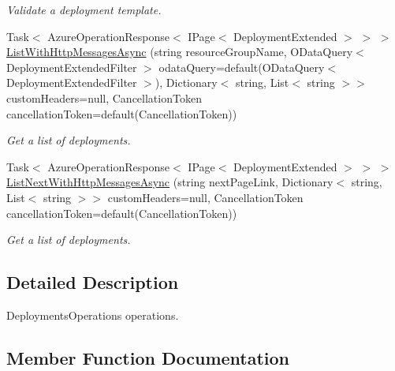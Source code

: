 \begin{DoxyCompactItemize}
\begin{DoxyCompactList}\small\item\em Validate a deployment template. \end{DoxyCompactList}\item 
Task$<$ Azure\+Operation\+Response$<$ I\+Page$<$ Deployment\+Extended $>$ $>$ $>$ \hyperlink{interface_microsoft_1_1_azure_1_1_management_1_1_resources_1_1_i_deployments_operations_a5c19611a775bc858103ff85f3b487bb9}{List\+With\+Http\+Messages\+Async} (string resource\+Group\+Name, O\+Data\+Query$<$ Deployment\+Extended\+Filter $>$ odata\+Query=default(O\+Data\+Query$<$ Deployment\+Extended\+Filter $>$), Dictionary$<$ string, List$<$ string $>$$>$ custom\+Headers=null, Cancellation\+Token cancellation\+Token=default(Cancellation\+Token))
\begin{DoxyCompactList}\small\item\em Get a list of deployments. \end{DoxyCompactList}\item 
Task$<$ Azure\+Operation\+Response$<$ I\+Page$<$ Deployment\+Extended $>$ $>$ $>$ \hyperlink{interface_microsoft_1_1_azure_1_1_management_1_1_resources_1_1_i_deployments_operations_a5489b13cf77a2aedd15a435cc06d022e}{List\+Next\+With\+Http\+Messages\+Async} (string next\+Page\+Link, Dictionary$<$ string, List$<$ string $>$$>$ custom\+Headers=null, Cancellation\+Token cancellation\+Token=default(Cancellation\+Token))
\begin{DoxyCompactList}\small\item\em Get a list of deployments. \end{DoxyCompactList}\end{DoxyCompactItemize}


\subsection{Detailed Description}
Deployments\+Operations operations. 



\subsection{Member Function Documentation}

